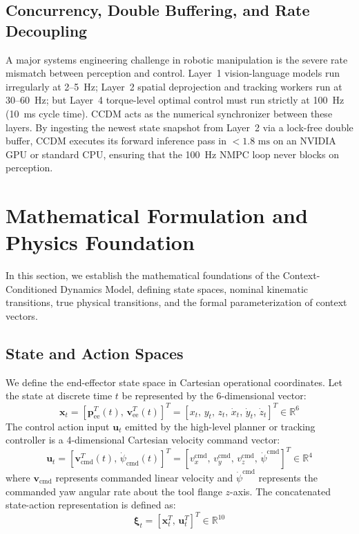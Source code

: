 \documentclass[10pt,a4paper]{article}
\begin{document}
\subsection{Concurrency, Double Buffering, and Rate Decoupling}
A major systems engineering challenge in robotic manipulation is the severe rate mismatch between perception and control. Layer~1 vision-language models run irregularly at 2--5~Hz; Layer~2 spatial deprojection and tracking workers run at 30--60~Hz; but Layer~4 torque-level optimal control must run strictly at 100~Hz (10~ms cycle time). CCDM acts as the numerical synchronizer between these layers. By ingesting the newest state snapshot from Layer~2 via a lock-free double buffer, CCDM executes its forward inference pass in \textbf{$< 1.8\text{ ms}$} on an NVIDIA GPU or standard CPU, ensuring that the 100~Hz NMPC loop never blocks on perception.

\newpage

\section{Mathematical Formulation and Physics Foundation}
In this section, we establish the mathematical foundations of the Context-Conditioned Dynamics Model, defining state spaces, nominal kinematic transitions, true physical transitions, and the formal parameterization of context vectors.

\subsection{State and Action Spaces}
We define the end-effector state space in Cartesian operational coordinates. Let the state at discrete time $t$ be represented by the 6-dimensional vector:
\begin{equation}
\mathbf{x}_t = [\mathbf{p}_{\mathrm{ee}}^T(t), \, \mathbf{v}_{\mathrm{ee}}^T(t)]^T = [x_t, \, y_t, \, z_t, \, \dot{x}_t, \, \dot{y}_t, \, \dot{z}_t]^T \in \mathbb{R}^6
\label{eq:state_space}
\end{equation}
The control action input $\mathbf{u}_t$ emitted by the high-level planner or tracking controller is a 4-dimensional Cartesian velocity command vector:
\begin{equation}
\mathbf{u}_t = [\mathbf{v}_{\mathrm{cmd}}^T(t), \, \dot{\psi}_{\mathrm{cmd}}(t)]^T = [v_x^{\mathrm{cmd}}, \, v_y^{\mathrm{cmd}}, \, v_z^{\mathrm{cmd}}, \, \dot{\psi}^{\mathrm{cmd}}]^T \in \mathbb{R}^4
\label{eq:action_space}
\end{equation}
where $\mathbf{v}_{\mathrm{cmd}}$ represents commanded linear velocity and $\dot{\psi}^{\mathrm{cmd}}$ represents the commanded yaw angular rate about the tool flange $z$-axis. The concatenated state-action representation is defined as:
\begin{equation}
\bm{\xi}_t = [\mathbf{x}_t^T, \, \mathbf{u}_t^T]^T \in \mathbb{R}^{10}
\label{eq:concatenated_state_action}
\end{equation}
\end{document}
